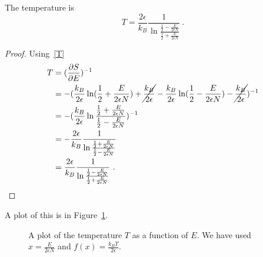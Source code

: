     The temperature is 
    \begin{equation*}
        T = \frac{2 \epsilon}{k_B} \frac{1}{\ln \frac{\frac{1}{2} - \frac{E}{2 \epsilon N}}{\frac{1}{2} + \frac{E}{2 \epsilon N}}} ~.
    \end{equation*}
    \begin{proof}
        Using~\eqref{T}
        \begin{equation*}
        \begin{aligned}
            T & = (\frac{\partial S}{\partial E})^{-1} \\ & = - (\frac{k_B}{2\epsilon} \ln (\frac{1}{2} + \frac{E}{2 \epsilon N}) + \cancel{\frac{k_B}{2\epsilon}} - \frac{k_B}{2\epsilon} \ln (\frac{1}{2} - \frac{E}{2 \epsilon N}) - \cancel{\frac{k_B}{2\epsilon}} )^{-1} \\ & = - (\frac{k_B}{2\epsilon} \ln \frac{\frac{1}{2} + \frac{E}{2 \epsilon N}}{\frac{1}{2} - \frac{E}{2 \epsilon N}})^{-1} \\ & = - \frac{2 \epsilon}{k_B} \frac{1}{\ln \frac{\frac{1}{2} + \frac{E}{2 \epsilon N}}{\frac{1}{2} - \frac{E}{2 \epsilon N}}} \\ & = \frac{2 \epsilon}{k_B} \frac{1}{\ln \frac{\frac{1}{2} - \frac{E}{2 \epsilon N}}{\frac{1}{2} + \frac{E}{2 \epsilon N}}} ~.
        \end{aligned}
        \end{equation*}
    \end{proof}
    A plot of this is in Figure~\ref{en:t}.
    \begin{figure}
        \centering
        \caption{A plot of the temperature $T$ as a function of $E$. We have used $x = \frac{E}{2 \epsilon N} $ and $f(x) = \frac{k_B T}{2 \epsilon}$.}
        \label{en:t}
    \end{figure}

